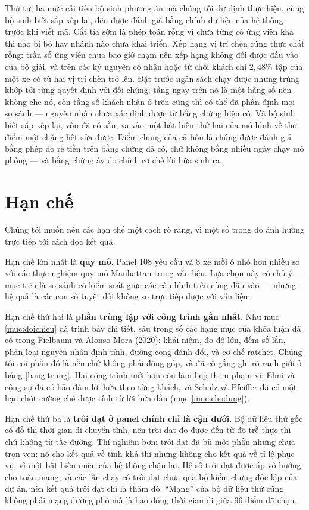 Thứ tư, ba mức cải tiến bộ sinh phương án mà chúng tôi dự định thực hiện, cùng bộ sinh biết sắp
xếp lại, đều được đánh giá bằng chính dữ liệu của hệ thống trước khi viết mã. Cắt tỉa sớm là phép
toán rỗng vì chưa từng có ứng viên khả thi nào bị bỏ hay nhánh nào chưa khai triển. Xếp hạng vị trí
chèn cũng thực chất rỗng: trần số ứng viên chưa bao giờ chạm nên xếp hạng không đổi được đầu vào
của bộ giải, và trên các kỷ nguyên có nhận hoặc từ chối khách chỉ $2{,}48\%$ tập của một xe có từ
hai vị trí chèn trở lên. Đặt trước ngân sách chạy được nhưng trùng khớp tới từng quyết định với đối
chứng; tầng ngay trên nó là một hằng số nên không che nó, còn tầng số khách nhận ở trên cùng thì có
thể đã phân định mọi so sánh --- nguyên nhân chưa xác định được từ bằng chứng hiện có. Và bộ sinh
biết sắp xếp lại, vốn đã có sẵn, va vào một bất biến thứ hai của mô hình về thời điểm một chặng hết
sửa được. Điểm chung của cả bốn là chúng được đánh giá
bằng phép đo rẻ tiền trên bằng chứng đã có, chứ không bằng nhiều ngày chạy mô phỏng --- và bằng
chứng ấy do chính cơ chế lời hứa sinh ra.

\section{Hạn chế}

Chúng tôi muốn nêu các hạn chế một cách rõ ràng, vì một số trong đó ảnh hưởng trực tiếp tới
cách đọc kết quả.

Hạn chế lớn nhất là \textbf{quy mô}. Panel 108 yêu cầu và 8 xe mỗi ô nhỏ hơn nhiều so với các
thực nghiệm quy mô Manhattan trong văn liệu. Lựa chọn này có chủ ý --- mục tiêu là so sánh có
kiểm soát giữa các cấu hình trên cùng đầu vào --- nhưng hệ quả là các con số tuyệt đối không so
trực tiếp được với văn liệu.

Hạn chế thứ hai là \textbf{phần trùng lặp với công trình gần nhất}. Như mục \ref{muc:doichieu} đã trình bày chi
tiết, sáu trong số các hạng mục của khóa luận đã có trong Fielbaum và Alonso-Mora (2020): khái
niệm, đo độ lớn, đếm số lần, phân loại nguyên nhân định tính, đường cong đánh đổi, và cơ chế
ratchet. Chúng tôi coi phần đó là nền chứ không phải đóng góp, và đã cố gắng ghi rõ ranh giới ở
bảng \ref{bang:trung}. Hai công trình mới hơn còn làm hẹp thêm phạm vi: Elmi và cộng sự đã có bảo
đảm lời hứa theo từng khách, và Schulz và Pfeiffer đã có một hạn chót cưỡng chế được tính từ lời
hứa đầu (mục \ref{muc:chodung}).

Hạn chế thứ ba là \textbf{trôi dạt ở panel chính chỉ là cận dưới}. Bộ dữ liệu thử gốc có đồ thị
thời gian di chuyển tĩnh, nên trôi dạt đo được đến từ độ trễ thực thi chứ không từ tắc đường.
Thí nghiệm bơm trôi dạt đã bù một phần nhưng chưa trọn vẹn: nó cho kết quả về tính khả thi nhưng
không cho kết quả về tỉ lệ phục vụ, vì một bất biến miền của hệ thống chặn lại. Hệ số trôi dạt
được áp vô hướng cho toàn mạng, và các lần chạy có trôi dạt chưa qua bộ kiểm chứng độc lập của
dự án, nên kết quả trôi dạt chỉ là thăm dò. ``Mạng'' của bộ dữ liệu thử cũng không phải mạng đường
phố mà là bao đóng thời gian đi giữa 96 điểm đã chọn.

